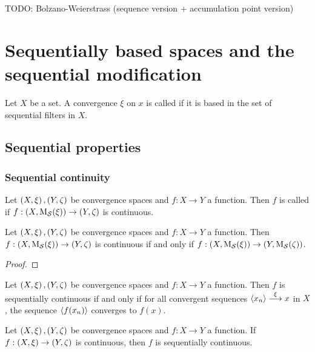 TODO: Bolzano-Weierstrass (sequence version + accumulation point version)

\section{Sequentially based spaces and the sequential modification}
\begin{definition}
Let $X$ be a set. A convergence $\xi$  on $x$ is called  if it is based in the set of sequential filters in $X$.
\end{definition}

\subsection{Sequential properties}
\subsubsection{Sequential continuity}
\begin{definition}
Let $\left( X,\xi \right), \left( Y,\zeta \right)$ be convergence spaces and $f:X\to Y$ a function. Then $f$ is called  if $f: \left( X, \operatorname{M_\mathcal{S}}(\xi) \right) \to \left( Y, \zeta \right)$ is continuous.
\end{definition}

\begin{lemma}
Let $\left( X,\xi \right), \left( Y,\zeta \right)$ be convergence spaces and $f:X\to Y$ a function. Then $f: \left( X, \operatorname{M_\mathcal{S}}(\xi) \right) \to \left( Y, \zeta \right)$ is continuous \textup{if and only if} $f: \left( X, \operatorname{M_\mathcal{S}}(\xi) \right) \to \left( Y, \operatorname{M_\mathcal{S}}(\zeta) \right)$.
\end{lemma}
\begin{proof}

\end{proof}

\begin{proposition}
Let $\left( X,\xi \right), \left( Y,\zeta \right)$ be convergence spaces and $f:X\to Y$ a function. Then $f$ is sequentially continuous \textup{if and only if} for all convergent sequences $\left\langle x_n \right\rangle\overset{\xi}{\longrightarrow} x$ in $X$, the sequence $\left\langle f(x_n) \right\rangle$ converges to $f(x)$.
\end{proposition}

\begin{proposition}
Let $\left( X,\xi \right), \left( Y,\zeta \right)$ be convergence spaces and $f:X\to Y$ a function. If $f:\left( X,\xi \right)\to \left( Y,\zeta \right)$ is continuous, then $f$ is sequentially continuous.
\end{proposition}

